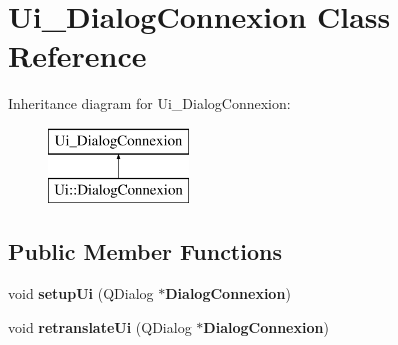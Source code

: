 \section{Ui\-\_\-\-Dialog\-Connexion Class Reference}
\label{class_ui___dialog_connexion}
Inheritance diagram for Ui\-\_\-\-Dialog\-Connexion\-:\begin{figure}[H]
\begin{center}
\leavevmode
\includegraphics[height=2.000000cm]{class_ui___dialog_connexion}
\end{center}
\end{figure}
\subsection*{Public Member Functions}
\begin{DoxyCompactItemize}
\item 
void {\bfseries setup\-Ui} (Q\-Dialog $\ast${\bf Dialog\-Connexion})\label{class_ui___dialog_connexion_a6291dbf1c6dca03c2a9e70d87007b113}

\item 
void {\bfseries retranslate\-Ui} (Q\-Dialog $\ast${\bf Dialog\-Connexion})\label{class_ui___dialog_connexion_a3c9e6d3213c98a4c3d21bb365e87f79c}

\end{DoxyCompactItemize}
